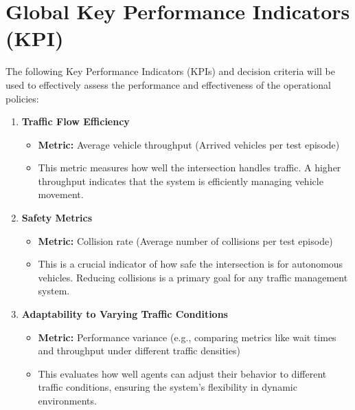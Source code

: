 \section{Global Key Performance Indicators (KPI)}

The following Key Performance Indicators (KPIs) and decision criteria will be used to effectively assess the performance and effectiveness of the operational policies:

\begin{enumerate}
    \item \textbf{Traffic Flow Efficiency}
    \begin{itemize}
        \item \textbf{Metric:} Average vehicle throughput (Arrived vehicles per test episode)
        \item This metric measures how well the intersection handles traffic. A higher throughput indicates that the system is efficiently managing vehicle movement.
    \end{itemize}
    
    \item \textbf{Safety Metrics}
    \begin{itemize}
        \item \textbf{Metric:} Collision rate (Average number of collisions per test episode)
        \item This is a crucial indicator of how safe the intersection is for autonomous vehicles. Reducing collisions is a primary goal for any traffic management system.
    \end{itemize}
    
    \item \textbf{Adaptability to Varying Traffic Conditions}
    \begin{itemize}
        \item \textbf{Metric:} Performance variance (e.g., comparing metrics like wait times and throughput under different traffic densities)
        \item This evaluates how well agents can adjust their behavior to different traffic conditions, ensuring the system's flexibility in dynamic environments.
    \end{itemize}
\end{enumerate}

